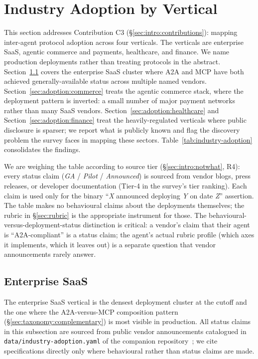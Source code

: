 \section{Industry Adoption by Vertical}
\label{sec:adoption}

This section addresses Contribution C3
(\S\ref{sec:intro:contributions}): mapping inter-agent
protocol adoption across four verticals. The verticals
are enterprise SaaS, agentic commerce and payments,
healthcare, and finance. We name production deployments
rather than treating protocols in the abstract.
Section~\ref{sec:adoption:saas}
covers the enterprise SaaS cluster where A2A and MCP have
both achieved generally-available status across multiple
named vendors. Section~\ref{sec:adoption:commerce} treats
the agentic commerce stack, where the deployment pattern is
inverted: a small number of major payment networks rather
than many SaaS vendors. Section~\ref{sec:adoption:healthcare}
and Section~\ref{sec:adoption:finance} treat the
heavily-regulated verticals where public disclosure is
sparser; we report what is publicly known and flag the
discovery problem the survey faces in mapping these
sectors. Table~\ref{tab:industry-adoption} consolidates the
findings.

We are weighing the table according to source tier
(\S\ref{sec:intro:notwhat}, R4): every status claim
(\emph{GA} / \emph{Pilot} / \emph{Announced}) is sourced
from vendor blogs, press releases, or developer
documentation (Tier-4 in the survey's tier ranking).
Each claim is used only for the binary ``\emph{X} announced
deploying \emph{Y} on date \emph{Z}'' assertion. The table
makes no behavioural claims about the deployments
themselves; the rubric in
\S\ref{sec:rubric} is the appropriate instrument for
those. The behavioural-versus-deployment-status
distinction is critical: a vendor's claim that their
agent is ``A2A-compliant'' is a status claim;
the agent's actual rubric profile (which axes it
implements, which it leaves out) is a separate question
that vendor announcements rarely answer.



\subsection{Enterprise SaaS}
\label{sec:adoption:saas}

The enterprise SaaS vertical is the densest deployment
cluster at the cutoff and the one where the
A2A-versus-MCP composition pattern
(\S\ref{sec:taxonomy:complementary}) is most visible in
production. All status claims in this subsection are
sourced from public vendor announcements catalogued in
\texttt{data/industry-adoption.yaml} of the companion
repository~\cite{vendor_announcements_2026}; we cite
specifications directly only where behavioural rather
than status claims are made.

